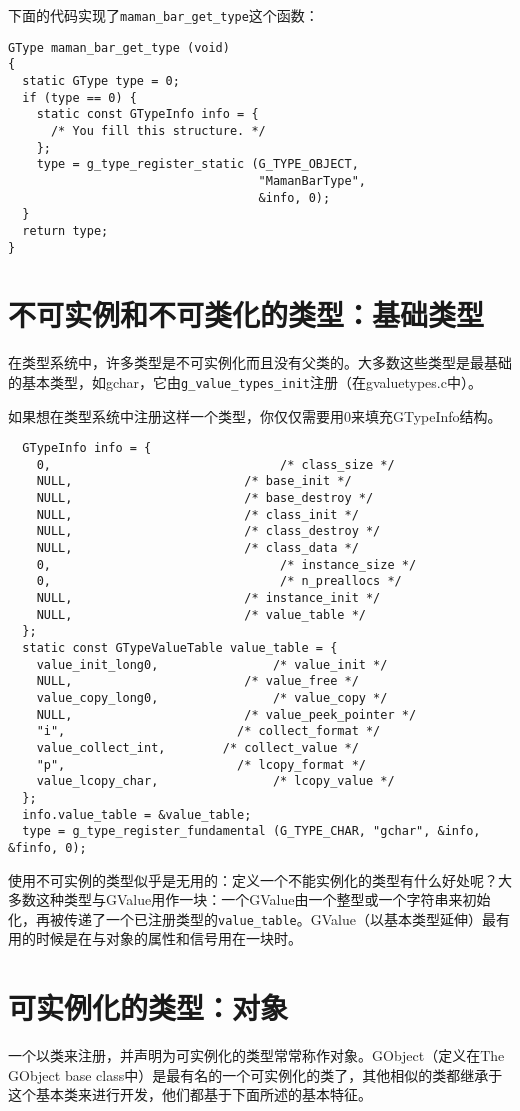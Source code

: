 下面的代码实现了\verb|maman_bar_get_type|这个函数：
\begin{verbatim}
GType maman_bar_get_type (void)
{
  static GType type = 0;
  if (type == 0) {
    static const GTypeInfo info = {
      /* You fill this structure. */
    };
    type = g_type_register_static (G_TYPE_OBJECT,
                                   "MamanBarType",
                                   &info, 0);
  }
  return type;
}
\end{verbatim}
\section{不可实例和不可类化的类型：基础类型}
在类型系统中，许多类型是不可实例化而且没有父类的。大多数这些类型是最基础的基本类型，如gchar，它由\verb|g_value_types_init|注册（在gvaluetypes.c中）。

如果想在类型系统中注册这样一个类型，你仅仅需要用0来填充GTypeInfo结构。
\begin{verbatim}
  GTypeInfo info = {
    0,                                /* class_size */
    NULL,                        /* base_init */
    NULL,                        /* base_destroy */
    NULL,                        /* class_init */
    NULL,                        /* class_destroy */
    NULL,                        /* class_data */
    0,                                /* instance_size */
    0,                                /* n_preallocs */
    NULL,                        /* instance_init */
    NULL,                        /* value_table */
  };
  static const GTypeValueTable value_table = {
    value_init_long0,                /* value_init */
    NULL,                        /* value_free */
    value_copy_long0,                /* value_copy */
    NULL,                        /* value_peek_pointer */
    "i",                        /* collect_format */
    value_collect_int,        /* collect_value */
    "p",                        /* lcopy_format */
    value_lcopy_char,                /* lcopy_value */
  };
  info.value_table = &value_table;
  type = g_type_register_fundamental (G_TYPE_CHAR, "gchar", &info, &finfo, 0);
\end{verbatim}

使用不可实例的类型似乎是无用的：定义一个不能实例化的类型有什么好处呢？大多数这种类型与GValue用作一块：一个GValue由一个整型或一个字符串来初始化，再被传递了一个已注册类型的\verb|value_table|。GValue（以基本类型延伸）最有用的时候是在与对象的属性和信号用在一块时。
\section{可实例化的类型：对象}
一个以类来注册，并声明为可实例化的类型常常称作对象。GObject（定义在The GObject base class中）是最有名的一个可实例化的类了，其他相似的类都继承于这个基本类来进行开发，他们都基于下面所述的基本特征。

